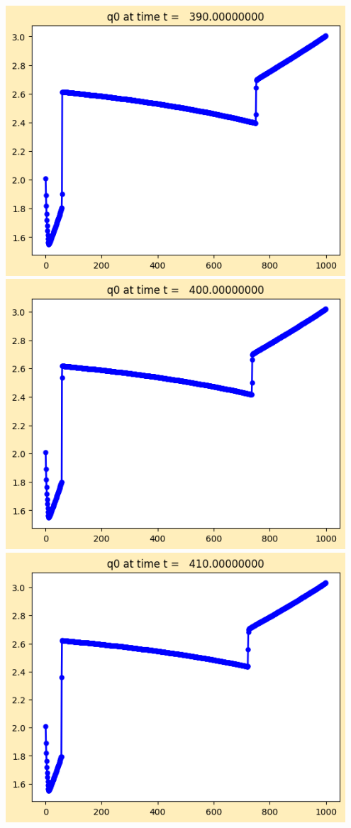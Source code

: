 \documentclass[11pt]{article}
\begin{document}
\vskip 10pt 
\includegraphics[width=0.95\textwidth]{frame0039fig1.png}
\vskip 10pt 
\includegraphics[width=0.95\textwidth]{frame0040fig1.png}
\vskip 10pt 
\includegraphics[width=0.95\textwidth]{frame0041fig1.png}
\end{document}

